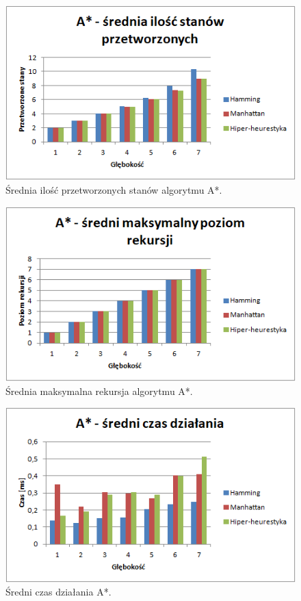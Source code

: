 \documentclass{classrep}
\begin{document}
\begin{figure}[H]
	\centering
		\includegraphics[width=1\textwidth]{Wykresy/13.png}
	\caption{Średnia ilość przetworzonych stanów algorytmu A*.}
\end{figure}
\begin{figure}[H]
	\centering
		\includegraphics[width=1\textwidth]{Wykresy/14.png}
	\caption{Średnia maksymalna rekursja algorytmu A*.}
\end{figure}
\begin{figure}[H]
	\centering
		\includegraphics[width=1\textwidth]{Wykresy/15.png}
	\caption{Średni czas działania A*.}
\end{figure}
\end{document}
